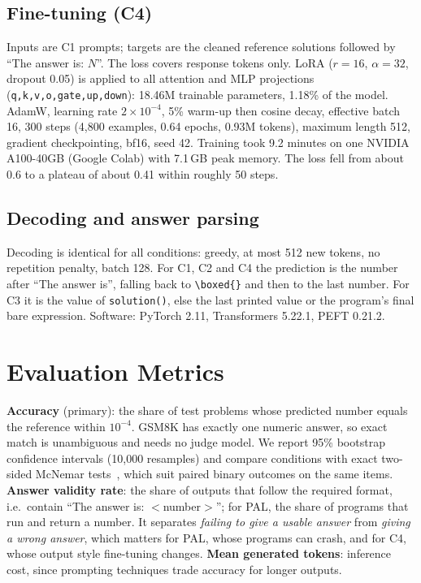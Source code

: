 \documentclass[conference]{IEEEtran}
\begin{document}
\subsection{Fine-tuning (C4)}
Inputs are C1 prompts; targets are the cleaned reference solutions followed by ``The answer is: $N$''. The
loss covers response tokens only. LoRA ($r{=}16$, $\alpha{=}32$, dropout 0.05) is applied to all attention
and MLP projections (\texttt{q,k,v,o,gate,up,down}): 18.46M trainable parameters, 1.18\% of the model.
AdamW, learning rate $2{\times}10^{-4}$, 5\% warm-up then cosine decay, effective batch 16, 300 steps
(4{,}800 examples, 0.64 epochs, 0.93M tokens), maximum length 512, gradient checkpointing, bf16, seed 42.
Training took 9.2 minutes on one NVIDIA A100-40GB (Google Colab) with 7.1\,GB peak memory. The loss fell
from about 0.6 to a plateau of about 0.41 within roughly 50 steps.

\subsection{Decoding and answer parsing}
Decoding is identical for all conditions: greedy, at most 512 new tokens, no repetition penalty, batch 128.
For C1, C2 and C4 the prediction is the number after ``The answer is'', falling back to
\texttt{\textbackslash boxed\{\}} and then to the last number. For C3 it is the value of \texttt{solution()},
else the last printed value or the program's final bare expression. Software: PyTorch 2.11,
Transformers 5.22.1, PEFT 0.21.2.

\section{Evaluation Metrics}
\textbf{Accuracy} (primary): the share of test problems whose predicted number equals the reference within
$10^{-4}$. GSM8K has exactly one numeric answer, so exact match is unambiguous and needs no judge model.
We report 95\% bootstrap confidence intervals (10{,}000 resamples) and compare conditions with exact
two-sided McNemar tests~\cite{mcnemar1947}, which suit paired binary outcomes on the same items.
\textbf{Answer validity rate}: the share of outputs that follow the required format, i.e.\ contain ``The
answer is: $<$number$>$''; for PAL, the share of programs that run and return a number. It separates
\emph{failing to give a usable answer} from \emph{giving a wrong answer}, which matters for PAL, whose
programs can crash, and for C4, whose output style fine-tuning changes.
\textbf{Mean generated tokens}: inference cost, since prompting techniques trade accuracy for longer outputs.
\end{document}
